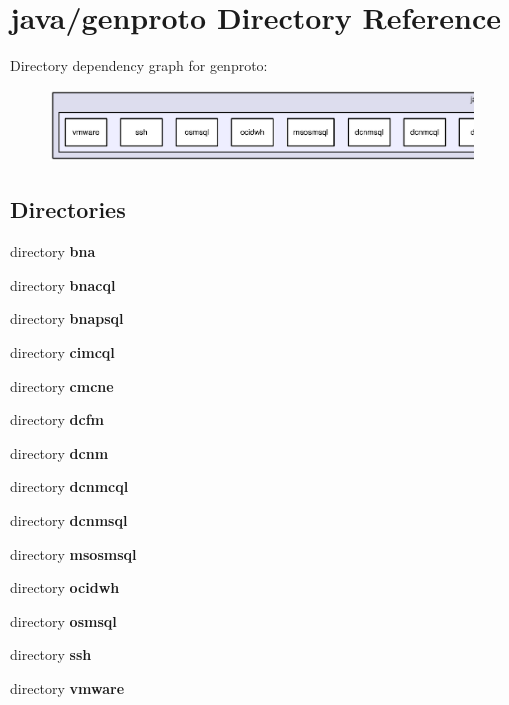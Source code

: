 \section{java/genproto Directory Reference}
\label{dir_0e43b3eaa74cb4b3a4cbe492a3c2d8cb}
Directory dependency graph for genproto\+:\nopagebreak
\begin{figure}[H]
\begin{center}
\leavevmode
\includegraphics[width=350pt]{dir_0e43b3eaa74cb4b3a4cbe492a3c2d8cb_dep}
\end{center}
\end{figure}
\subsection*{Directories}
\begin{DoxyCompactItemize}
\item 
directory {\bf bna}
\item 
directory {\bf bnacql}
\item 
directory {\bf bnapsql}
\item 
directory {\bf cimcql}
\item 
directory {\bf cmcne}
\item 
directory {\bf dcfm}
\item 
directory {\bf dcnm}
\item 
directory {\bf dcnmcql}
\item 
directory {\bf dcnmsql}
\item 
directory {\bf msosmsql}
\item 
directory {\bf ocidwh}
\item 
directory {\bf osmsql}
\item 
directory {\bf ssh}
\item 
directory {\bf vmware}
\end{DoxyCompactItemize}
